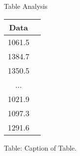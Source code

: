 \documentclass{beamer}
\begin{document}
\begin{frame}{Table Analysis}
    \begin{tabular}{|c|c|}
        \hline 
        \textbf{Data}\\
        \hline
        1061.5 \\
        1384.7 \\
        1350.5 \\
        ...    \\
        1021.9 \\
        1097.3 \\
        1291.6 \\
        \hline
    \end{tabular}

{Table:} Caption of Table.
\end{frame}
\end{document}
